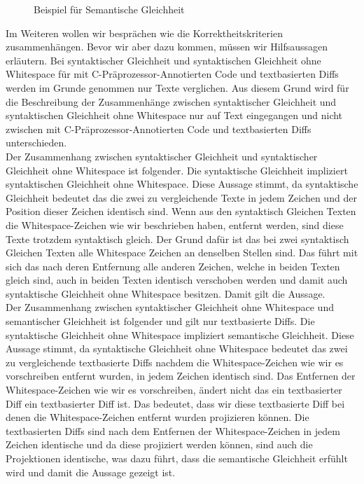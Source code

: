 \begin{figure}[H]
	\caption{Beispiel für Semantische Gleichheit }
\end{figure}


Im Weiteren wollen wir besprächen wie die Korrektheitskriterien zusammenhängen. Bevor wir aber dazu kommen, müssen wir Hilfsaussagen erläutern. Bei syntaktischer Gleichheit und syntaktischen Gleichheit ohne Whitespace für mit C-Präprozessor-Annotierten Code und textbasierten Diffs werden im Grunde genommen nur Texte verglichen. Aus diesem Grund wird für die Beschreibung der Zusammenhänge zwischen syntaktischer Gleichheit und syntaktischen Gleichheit ohne Whitespace nur auf Text eingegangen und nicht zwischen mit C-Präprozessor-Annotierten Code und textbasierten Diffs unterschieden.\\

Der Zusammenhang zwischen syntaktischer Gleichheit und syntaktischer Gleichheit ohne Whitespace ist folgender. Die syntaktische Gleichheit impliziert syntaktischen Gleichheit ohne Whitespace. Diese Aussage stimmt, da syntaktische Gleichheit bedeutet das die zwei zu vergleichende Texte in jedem Zeichen und der Position dieser Zeichen identisch sind. Wenn aus den syntaktisch Gleichen Texten die Whitespace-Zeichen wie wir beschrieben haben, entfernt werden, sind diese Texte trotzdem syntaktisch gleich. Der Grund dafür ist das bei zwei syntaktisch Gleichen Texten alle Whitespace Zeichen an denselben Stellen sind. Das führt mit sich das nach deren Entfernung alle anderen Zeichen, welche in beiden Texten gleich sind, auch in beiden Texten identisch verschoben werden und damit auch syntaktische Gleichheit ohne Whitespace besitzen. Damit gilt die Aussage.\\

Der Zusammenhang zwischen syntaktischer Gleichheit ohne Whitespace und semantischer Gleichheit ist folgender und gilt nur textbasierte Diffs. Die syntaktische Gleichheit ohne Whitespace impliziert semantische Gleichheit. Diese Aussage stimmt, da syntaktische Gleichheit ohne Whitespace bedeutet das zwei zu vergleichende textbasierte Diffs nachdem die Whitespace-Zeichen wie wir es vorschreiben entfernt wurden, in jedem Zeichen identisch sind. Das Entfernen der Whitespace-Zeichen wie wir es vorschreiben, ändert nicht das ein textbasierter Diff ein textbasierter Diff ist. Das bedeutet, dass wir diese textbasierte Diff bei denen die Whitespace-Zeichen entfernt wurden projizieren können. Die textbasierten Diffs sind nach dem Entfernen der Whitespace-Zeichen in jedem Zeichen identische und da diese projiziert werden können, sind auch die Projektionen identische, was dazu führt, dass die semantische Gleichheit erfühlt wird und damit die Aussage gezeigt ist.



